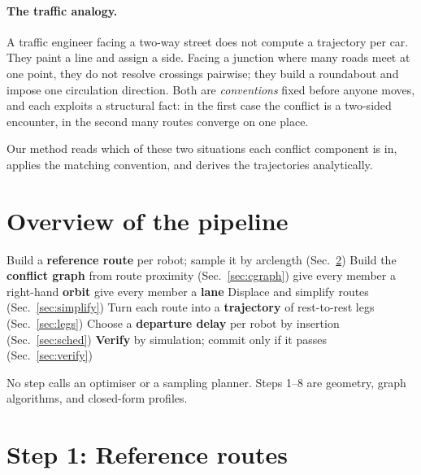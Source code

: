 \documentclass[11pt,a4paper]{article}
\begin{document}
\paragraph{The traffic analogy.} A traffic engineer facing a two-way street does not compute
a trajectory per car. They paint a line and assign a side. Facing a junction where many
roads meet at one point, they do not resolve crossings pairwise; they build a roundabout and
impose one circulation direction. Both are \emph{conventions} fixed before anyone moves, and
each exploits a structural fact: in the first case the conflict is a two-sided encounter, in
the second many routes converge on one place.

Our method reads which of these two situations each conflict component is in, applies the
matching convention, and derives the trajectories analytically.

\section{Overview of the pipeline}

\begin{algorithm}[h]
\caption{Conflict-derived constructive planning}
\begin{algorithmic}[1]
\State Build a \textbf{reference route} per robot; sample it by arclength (Sec.~\ref{sec:refs})
\State Build the \textbf{conflict graph} from route proximity (Sec.~\ref{sec:cgraph})
   
    \State give every member a right-hand \textbf{orbit} 
  \Else
    \State give every member a \textbf{lane} 
  \EndIf
\EndFor
\State Displace and simplify routes (Sec.~\ref{sec:simplify})
\State Turn each route into a \textbf{trajectory} of rest-to-rest legs (Sec.~\ref{sec:legs})
\State Choose a \textbf{departure delay} per robot by insertion (Sec.~\ref{sec:sched})
\State \textbf{Verify} by simulation; commit only if it passes (Sec.~\ref{sec:verify})
\end{algorithmic}
\end{algorithm}

No step calls an optimiser or a sampling planner. Steps 1--8 are geometry, graph algorithms,
and closed-form profiles.

\section{Step 1: Reference routes}
\label{sec:refs}
\end{document}
